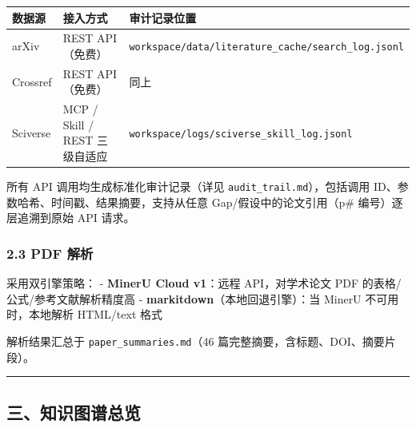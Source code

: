 \documentclass[12pt,a4paper]{ctexart}
\begin{document}
{\def\LTcaptype{none} %
\begin{longtable}[]{@{}
  >{\raggedright\arraybackslash}p{}
  >{\raggedright\arraybackslash}p{}
  >{\raggedright\arraybackslash}p{}@{}}
\toprule\noalign{}
\begin{minipage}[b]{\linewidth}\raggedright
数据源
\end{minipage} & \begin{minipage}[b]{\linewidth}\raggedright
接入方式
\end{minipage} & \begin{minipage}[b]{\linewidth}\raggedright
审计记录位置
\end{minipage} \\
\midrule\noalign{}
\endhead
\bottomrule\noalign{}
\endlastfoot
arXiv & REST API（免费） & \texttt{workspace/data/literature\_cache/search\_log.jsonl} \\
Crossref & REST API（免费） & 同上 \\
Sciverse & MCP / Skill / REST 三级自适应 & \texttt{workspace/logs/sciverse\_skill\_log.jsonl} \\
\end{longtable}
}

所有 API 调用均生成标准化审计记录（详见 \texttt{audit\_trail.md}），包括调用 ID、参数哈希、时间戳、结果摘要，支持从任意 Gap/假设中的论文引用（p\# 编号）逐层追溯到原始 API 请求。

\subsubsection{2.3 PDF 解析}\label{pdf-ux89e3ux6790}

采用双引擎策略： - \textbf{MinerU Cloud v1}：远程 API，对学术论文 PDF 的表格/公式/参考文献解析精度高 - \textbf{markitdown}（本地回退引擎）：当 MinerU 不可用时，本地解析 HTML/text 格式

解析结果汇总于 \texttt{paper\_summaries.md}（46 篇完整摘要，含标题、DOI、摘要片段）。

\begin{center}\rule{0.5\linewidth}{0.5pt}\end{center}

\subsection{三、知识图谱总览}\label{ux4e09ux77e5ux8bc6ux56feux8c31ux603bux89c8}
\end{document}
